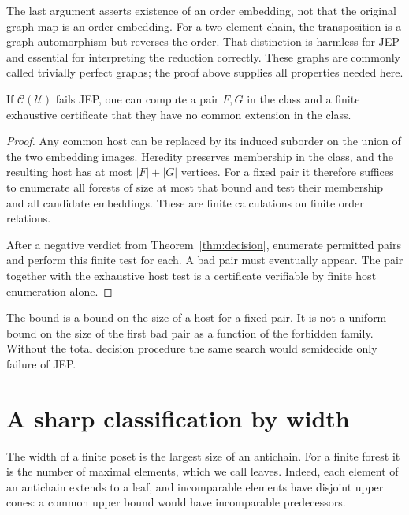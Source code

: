 \documentclass[11pt]{article}
\begin{document}
The last argument asserts existence of an order embedding, not that
the original graph map is an order embedding. For a two-element chain,
the transposition is a graph automorphism but reverses the order.
That distinction is harmless for JEP and essential for interpreting
the reduction correctly. These graphs are commonly called trivially
perfect graphs; the proof above supplies all properties needed here.



\begin{proposition}
\label{prop:certificate}
If $\mathcal C(\mathcal U)$ fails JEP, one can compute a pair $F,G$ in
the class and a finite exhaustive certificate that they have no common
extension in the class.
\end{proposition}
\begin{proof}
Any common host can be replaced by its induced suborder on the union
of the two embedding images. Heredity preserves membership in the
class, and the resulting host has at most $|F|+|G|$ vertices. For a
fixed pair it therefore suffices to enumerate all forests of size at
most that bound and test their membership and all candidate embeddings.
These are finite calculations on finite order relations.

After a negative verdict from Theorem~\ref{thm:decision}, enumerate
permitted pairs and perform this finite test for each. A bad pair must
eventually appear. The pair together with the exhaustive host test is
a certificate verifiable by finite host enumeration alone.
\end{proof}

The bound is a bound on the size of a host for a fixed pair. It is not
a uniform bound on the size of the first bad pair as a function of the
forbidden family. Without the total decision procedure the same search would
semidecide only failure of JEP.

\section{A sharp classification by width}
The width of a finite poset is the largest size of an antichain. For a
finite forest it is the number of maximal elements, which we call leaves.
Indeed, each element of an antichain extends to a leaf, and incomparable
elements have disjoint upper cones: a common upper bound would have
incomparable predecessors.
\end{document}
